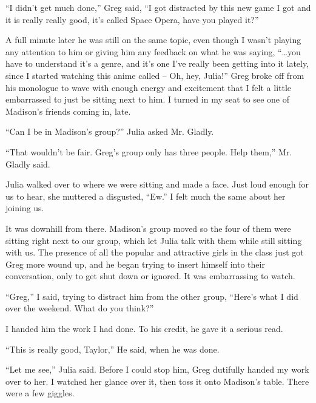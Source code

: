 ``I didn't get much done,'' Greg said, ``I got distracted by this new game I got and it is really really good, it's called Space Opera, have you played it?''



A full minute later he was still on the same topic, even though I wasn't playing any attention to him or giving him any feedback on what he was saying, ``\ldots{}you have to understand it's a genre, and it's one I've really been getting into it lately, since I started watching this anime called – Oh, hey, Julia!''  Greg broke off from his monologue to wave with enough energy and excitement that I felt a little embarrassed to just be sitting next to him.  I turned in my seat to see one of Madison's friends coming in, late.



``Can I be in Madison's group?'' Julia asked Mr. Gladly.



``That wouldn't be fair.  Greg's group only has three people.  Help them,'' Mr. Gladly said.



Julia walked over to where we were sitting and made a face.  Just loud enough for us to hear, she muttered a disgusted, ``Ew.''  I felt much the same about her joining us.



It was downhill from there.  Madison's group moved so the four of them were sitting right next to our group, which let Julia talk with them while still sitting with us.  The presence of all the popular and attractive girls in the class just got Greg more wound up, and he began trying to insert himself into their conversation, only to get shut down or ignored.  It was embarrassing to watch.



``Greg,'' I said, trying to distract him from the other group, ``Here's what I did over the weekend.  What do you think?''



I handed him the work I had done.  To his credit, he gave it a serious read.



``This is really good, Taylor,'' He said, when he was done.



``Let me see,'' Julia said.  Before I could stop him, Greg dutifully handed my work over to her.  I watched her glance over it, then toss it onto Madison's table.  There were a few giggles.




